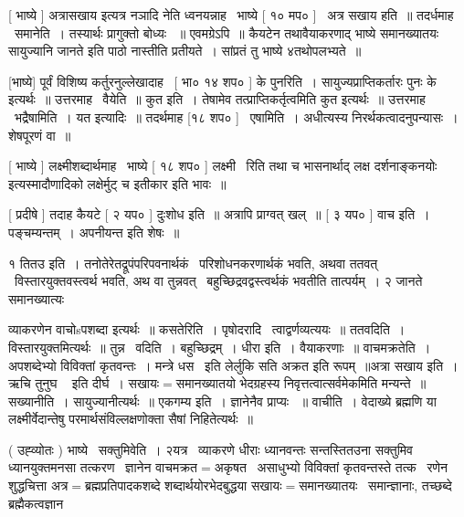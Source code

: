 \documentclass[11pt, openany]{book}
\begin{document}
 [ भाष्ये ] अत्रासखाय इत्यत्र नञादि नेति ध्वनयन्नाह \textendash\ भाष्ये [ १०
मप० ] \textendash\ अत्र सखाय हति~॥ तदर्धमाह \textendash\ समानेति~। तस्यार्थः प्रागुक्तो बोध्यः
~॥ एवमग्रेऽपि~॥ कैयटेन तथावैयाकरणाद् भाष्ये {\qt समानख्यातयः सायुज्यानि
जानते} इति पाठो नास्तीति प्रतीयते~। सांप्रतं तु भाष्ये ४तथोपलभ्यते~॥


 [भाष्ये] पूर्वं विशिष्य कर्तुरनुल्लेखादाह \textendash\ [ भा० १४ शप० ] के
पुनरिति~। सायुज्यप्राप्तिकर्तारः पुनः के इत्यर्थः~॥ उत्तरमाह \textendash\ वैयेति~॥
कुत इति~। तेषामेव तत्प्राप्तिकर्तृत्वमिति कुत इत्यर्थः~॥
उत्तरमाह \textendash\ भद्रैषामिति~। यत इत्यादिः~॥ तदर्थमाह [१८ शप० ] \textendash\ एषामिति~। 
अधीत्यस्य निरर्थकत्वादनुपन्यासः~। शेषपूरणं वा~॥ 

 [ भाष्ये ] लक्ष्मीशब्दार्थमाह \textendash\ भाष्ये [ १८ शप० ] लक्ष्मी \textendash\ रिति
तथा च भासनार्थाद् {\qt लक्ष दर्शनाङ्कनयोः} इत्यस्मादौणादिको {\qt लक्षेर्मुट्
च} इतीकार इति भावः~॥ 

 [ प्रदीषे ] तदाह कैयटे [ २ यप० ] दुःशोध इति~॥ अत्रापि
प्राग्वत् खल्~॥ [ ३ यप० ] वाच इति~। पङ्चम्यन्तम्~। अपनीयन्त इति
शेषः~॥ 



१ तितउ इति~। तनोतेरेतद्रूपंपरिपवनार्थकं \textendash\ परिशोधनकरणार्थकं भवति, अथवा
ततवत् \textendash\ विस्तारयुक्तवस्त्वर्थ भवति, अथ वा तुन्नवत् \textendash\ 
बहुच्छिद्रवद्वस्त्वर्थकं भवतीति तात्पर्यम्~। २ जानते समानख्यात्यः 





व्याकरणेन वाचोsपशब्दा इत्यर्थः~॥ कसतेरिति~। पृषोदरादि \textendash\ 
त्वाद्वर्णव्यत्ययः~॥ ततवदिति~। विस्तारयुक्तमित्यर्थः~॥ तुन्न \textendash\ 
वदिति~। बहुच्छिद्रम्~। धीरा इति~। वैयाकरणाः~॥ वाचमक्रतेति~। 
अपशब्देभ्यो विविक्तां कृतवन्तः~। {\qt मन्त्रे धस} \textendash\ इति लेर्लुकि सति
{\qt अक्रत} इति रूपम्~॥अत्रा सखाय इति~। {\qt ऋचि तुनुघ \textendash\ } इति दीर्घ~। 
सखायः$=$समानख्यातयो भेदग्रहस्य निवृत्तत्वात्सर्वमेकमिति मन्यन्ते~॥
सख्यानीति~। सायुज्यानीत्यर्थः~॥ एकगम्य इति~। ज्ञानेनैव प्राप्यः
~॥ वाचीति~। वेदाख्ये ब्रह्मणि या लक्ष्मीर्वेदान्तेषु
परमार्थसंविल्लक्षणोक्ता सैषां निहितेत्यर्थः~॥ 

 ( उह्व्योतः ) भाष्ये \textendash\ सक्तुमिवेति~। २यत्र \textendash\ व्याकरणे धीराः ध्यानवन्तः
सन्तस्तितउना सक्तुमिव ध्यानयुक्तमनसा तत्करण \textendash\ ज्ञानेन
वाचमक्रत$=$अकृषत \textendash\ असाधुभ्यो विविक्तां कृतवन्तस्ते तत्क \textendash\ रणेन शुद्धचित्ता
अत्र$=$ब्रह्मप्रतिपादकशब्दे शब्दार्थयोरभेदबुद्धया
सखायः$=$समानख्यातयः \textendash\ समान्ज्ञानाः, तच्छब्दे ब्रह्मैकत्वज्ञान \textendash\ 
\end{document}
